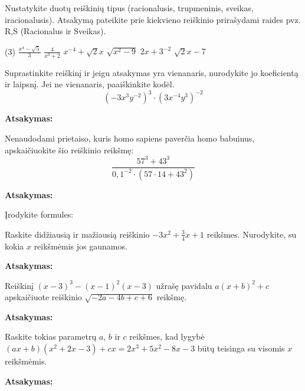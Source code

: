 \documentclass[12pt]{exam}
\newcommand{\atsakymas}{%
    \par\vspace{0.3cm}
    \textbf{Atsakymas:} \framebox[7cm]{\rule{0pt}{0.7cm}}
}
\begin{document}
\begin{questions}

\question[3] Nustatykite duotų reiškinių tipus (racionalusis, trupmeninis, sveikas, iracionalusis). Atsakymą pateikite prie kiekvieno reiškinio prirašydami raides pvz. R,S (Racionalus ir Sveikas).
\begin{tasks}[label-width=1.2em](3)
    \task $\displaystyle \frac{x^4 - \sqrt{5}}{3}$
    \task $\displaystyle \frac{4}{x^3 + 2}$
    \task $\displaystyle x^{-4} + \sqrt{2} x$
    \task $\displaystyle \sqrt{x^2 - 9}$
    \task $\displaystyle 2x+3 ^{-2} $
    \task $\displaystyle \sqrt{2}x-7 $
\end{tasks}
\droppoints

\question[4] Suprastinkite reiškinį ir jeigu atsakymas yra vienanaris, nurodykite jo koeficientą ir laipsnį. Jei ne vienanaris, paaiškinkite kodėl.
$$ \left( -3x^3y^{-2} \right)^3 \cdot \left( 3x^{-4}y^3 \right)^{-2} $$
\droppoints
\vspace{2.5cm}
\atsakymas

\question[4] Nenaudodami prietaiso, kuris homo sapiens paverčia homo babuinus, apskaičiuokite šio reiškinio reikšmę:
 $$\displaystyle \frac{57^3 + 43^3}{0,1 ^{-2} \cdot (57 \cdot 14+43 ^{2} ) } $$ \droppoints
\vspace{3.5cm}
\atsakymas

\question Įrodykite formules:
\newpage

\question[4] Raskite didžiausią ir mažiausią reiškinio $-3x^2 + \frac{3}{4} x + 1$ reikšmes. Nurodykite, su kokia $x$ reikšmėmis jos gaunamos.
\droppoints
\vspace{3.5cm}
\atsakymas

\question[5]  Reiškinį $(x-3) ^{3} -(x-1) ^{2} (x-3)$ užrašę pavidalu $a(x+b)^{2} + c$ apskaičiuote reiškinio $\sqrt{-2a-4b+c+6} $ reikšmę.   
\droppoints
\vspace{3.5cm}
\atsakymas

\question[4] Raskite tokias parametrų $a$, $b$ ir $c$ reikšmes, kad lygybė $(ax+b)(x^2+2x-3) + cx = 2x^3+5x^2-8x-3$ būtų teisinga su visomis $x$ reikšmėmis.
\droppoints
\vspace{4.5cm}
\atsakymas

\end{questions}
\end{document}
